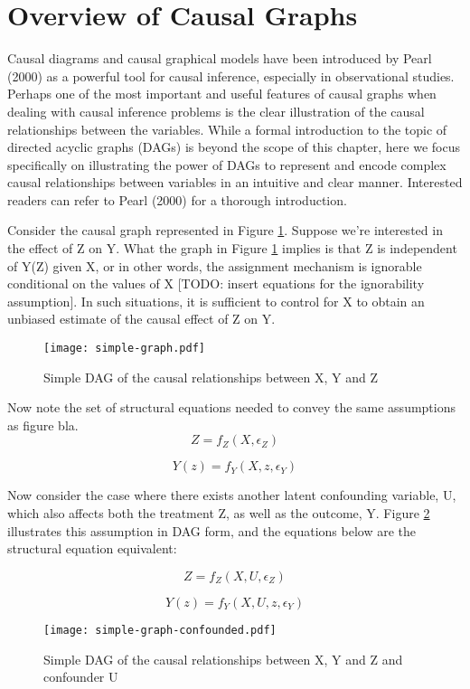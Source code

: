 \section{Overview of Causal Graphs}

Causal diagrams and causal graphical models have been introduced by Pearl 
(2000) as a powerful tool for causal inference, especially in observational 
studies. Perhaps one of the most important and useful features of causal 
graphs when dealing with causal inference problems is the clear illustration 
of the causal relationships between the variables. 
While a formal introduction to the topic of directed acyclic graphs (DAGs) is beyond the scope of this chapter, 
here we focus specifically on illustrating the power of DAGs to represent 
and encode complex  causal relationships between variables in an intuitive and 
clear manner. Interested readers can refer to Pearl (2000) for a thorough introduction. 


Consider the causal graph represented in Figure \ref{fig:simple-graph}. Suppose we're interested 
in the effect of Z on Y. What the graph in Figure \ref{fig:simple-graph} implies is that Z is 
independent of Y(Z) given X, or in other words, the assignment mechanism is 
ignorable conditional on the values of X [TODO: insert equations for the 
ignorability assumption]. In such situations, it is sufficient to control for 
X to obtain an unbiased estimate of the causal effect of Z on Y. 

\begin{figure}
   \centering
   \texttt{[image: simple-graph.pdf]}
   \caption{Simple DAG of the causal relationships between X, Y and Z}
   \label{fig:simple-graph}
\end{figure}

Now note the set of structural equations needed to convey the same assumptions as figure bla. 
\[Z = f_Z(X, \epsilon_Z)  \]

\[Y(z) = f_Y(X, z, \epsilon_Y)  \]

Now consider the case where there exists another latent confounding variable, U, which also affects both the treatment Z, as well as the outcome, Y. Figure \ref{fig:simple-graph-confounded} illustrates this assumption in DAG form, and the equations below are the structural equation equivalent:

\[Z = f_Z(X, U, \epsilon_Z)  \]

\[Y(z) = f_Y(X, U, z, \epsilon_Y)  \]

\begin{figure}
   \centering
   \texttt{[image: simple-graph-confounded.pdf]}
   \caption{Simple DAG of the causal relationships between X, Y and Z and confounder U}
   \label{fig:simple-graph-confounded}
\end{figure}

